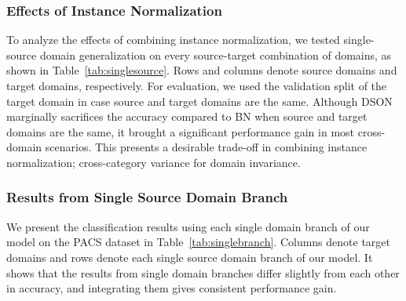 \documentclass[runningheads]{llncs}
\begin{document}
\subsubsection{Effects of Instance Normalization}
To analyze the effects of combining instance normalization, we tested single-source domain generalization on every source-target combination of domains, as shown in Table~\ref{tab:singlesource}.
Rows and columns denote source domains and target domains, respectively.
For evaluation, we used the validation split of the target domain in case source and target domains are the same.
Although DSON marginally sacrifices the accuracy compared to BN when source and target domains are the same, it brought a significant performance gain in most cross-domain scenarios. This presents a desirable trade-off in combining instance normalization; cross-category variance for domain invariance.


 \begin{table}[!t]
	\begin{center}
	\caption{Results from single source domain branch on the PACS dataset.
	Columns denote target domains and rows denote the single source domain branch of our model.
	}
	\label{tab:singlebranch}
	\end{center}
\end{table}

\subsubsection{Results from Single Source Domain Branch}
We present the classification results using each single domain branch of our model on the PACS dataset in Table~\ref{tab:singlebranch}.
Columns denote target domains and rows denote each single source domain branch of our model.
It shows that the results from single domain branches differ slightly from each other in accuracy, and integrating them gives consistent performance gain.
\end{document}
